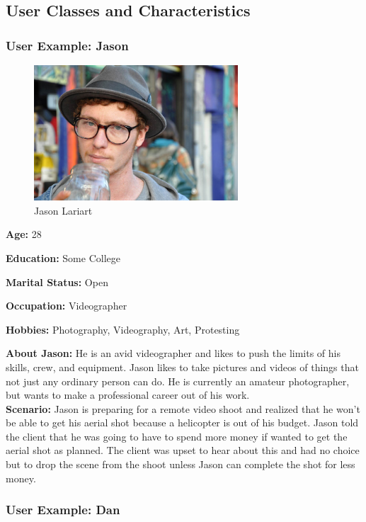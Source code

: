\documentclass[english]{article}
\numberwithin{equation}{section} %
\begin{document}
\subsection{User Classes and Characteristics}

\subsubsection{User Example: Jason}

\begin{figure}[h!]
  \centering
	\includegraphics[width=3in]{hipster1.jpg}
  \caption{Jason Lariart}
\end{figure}

\textbf{ Age:} 28

\textbf{ Education:} Some College

\textbf{ Marital Status:} Open

\textbf{ Occupation:} Videographer

\textbf{ Hobbies:} Photography, Videography, Art, Protesting

\textbf{About Jason:} He is an avid videographer and likes to push the limits of his skills, crew, and equipment. Jason likes to take pictures and videos of things that not just any ordinary person can do. He is currently an amateur photographer, but wants to make a professional career out of his work.
\\

\textbf{Scenario:} Jason is preparing for a remote video shoot and realized that he won't be able to get his aerial shot because a helicopter is out of his budget. Jason told the client that he was going to have to spend more money if wanted to get the aerial shot as planned. The client was upset to hear about this and had no choice but to drop the scene from the shoot unless Jason can complete the shot for less money.

\newpage
\subsubsection{User Example: Dan}
\end{document}

